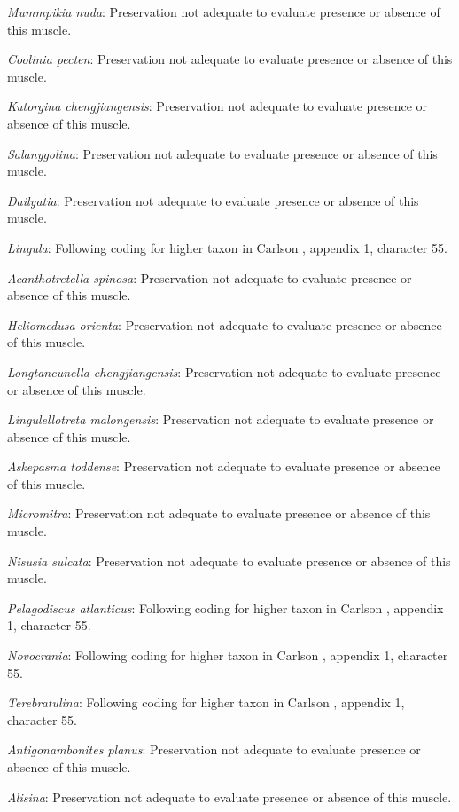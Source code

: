\documentclass[]{book}
\theoremstyle{definition}
\theoremstyle{definition}
\theoremstyle{definition}
\theoremstyle{remark}
\begin{document}
\emph{Mummpikia nuda}: Preservation not adequate to evaluate presence or
absence of this muscle.

\emph{Coolinia pecten}: Preservation not adequate to evaluate presence
or absence of this muscle.

\emph{Kutorgina chengjiangensis}: Preservation not adequate to evaluate
presence or absence of this muscle.

\emph{Salanygolina}: Preservation not adequate to evaluate presence or
absence of this muscle.

\emph{Dailyatia}: Preservation not adequate to evaluate presence or
absence of this muscle.

\emph{Lingula}: Following coding for higher taxon in Carlson
\citeyearpar{Carlson1995Phylogeneticrelationships}, appendix 1,
character 55.

\emph{Acanthotretella spinosa}: Preservation not adequate to evaluate
presence or absence of this muscle.

\emph{Heliomedusa orienta}: Preservation not adequate to evaluate
presence or absence of this muscle.

\emph{Longtancunella chengjiangensis}: Preservation not adequate to
evaluate presence or absence of this muscle.

\emph{Lingulellotreta malongensis}: Preservation not adequate to
evaluate presence or absence of this muscle.

\emph{Askepasma toddense}: Preservation not adequate to evaluate
presence or absence of this muscle.

\emph{Micromitra}: Preservation not adequate to evaluate presence or
absence of this muscle.

\emph{Nisusia sulcata}: Preservation not adequate to evaluate presence
or absence of this muscle.

\emph{Pelagodiscus atlanticus}: Following coding for higher taxon in
Carlson \citeyearpar{Carlson1995Phylogeneticrelationships}, appendix 1,
character 55.

\emph{Novocrania}: Following coding for higher taxon in Carlson
\citeyearpar{Carlson1995Phylogeneticrelationships}, appendix 1,
character 55.

\emph{Terebratulina}: Following coding for higher taxon in Carlson
\citeyearpar{Carlson1995Phylogeneticrelationships}, appendix 1,
character 55.

\emph{Antigonambonites planus}: Preservation not adequate to evaluate
presence or absence of this muscle.

\emph{Alisina}: Preservation not adequate to evaluate presence or
absence of this muscle.
\end{document}
